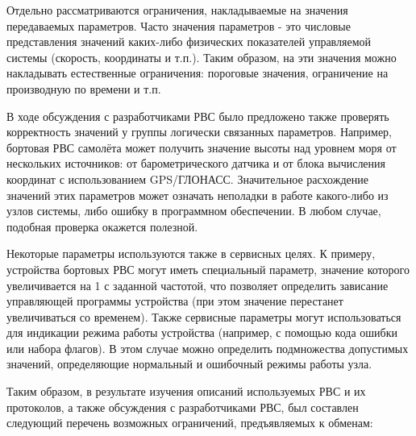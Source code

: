 Отдельно рассматриваются ограничения, накладываемые на значения передаваемых 
параметров. Часто значения параметров - это числовые представления значений 
каких-либо физических показателей управляемой системы (скорость, координаты и 
т.п.). Таким образом, на эти значения можно накладывать естественные 
ограничения: пороговые значения, ограничение на производную по времени и т.п.

В ходе обсуждения с разработчиками РВС было предложено также проверять 
корректность значений у группы логически связанных параметров. Например, 
бортовая РВС самолёта может получить значение высоты над уровнем моря от 
нескольких источников: от барометрического датчика и от блока вычисления 
координат с использованием GPS/ГЛОНАСС. Значительное расхождение значений 
этих параметров может означать неполадки в работе какого-либо из узлов системы, 
либо ошибку в программном обеспечении. В любом случае, подобная проверка 
окажется полезной.

Некоторые параметры используются также в сервисных целях. К примеру, 
устройства бортовых РВС могут иметь специальный параметр, значение 
которого увеличивается на 1 с заданной частотой, что позволяет 
определить зависание управляющей программы устройства (при этом значение
перестанет увеличиваться со временем). Также сервисные параметры могут 
использоваться для индикации режима работы устройства (например, с помощью 
кода ошибки или набора флагов). В этом случае можно определить подмножества 
допустимых значений, определяющие нормальный и ошибочный режимы работы узла.

Таким образом, в результате изучения описаний используемых РВС и их протоколов, 
а также обсуждения с разработчиками РВС, был составлен следующий перечень 
возможных ограничений, предъявляемых к обменам:

